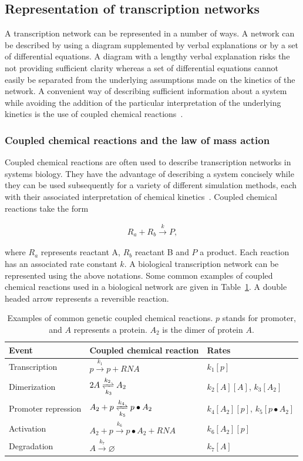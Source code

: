 \subsection{Representation of transcription networks}
A transcription network can be represented in a number of ways. A network can be described by using a diagram supplemented by verbal explanations or by a set of differential equations. A diagram with a lengthy verbal explanation risks the not providing sufficient clarity whereas a set of differential equations cannot easily be separated from the underlying assumptions made on the kinetics of the network. A convenient way of describing sufficient information about a system while avoiding the addition of the particular interpretation of the underlying kinetics is the use of coupled chemical reactions~\autocite{Wilkinson:2006td}. 

\subsubsection{Coupled chemical reactions and the law of mass action}

Coupled chemical reactions are often used to describe transcription networks in systems biology. They have the advantage of describing a system concisely while they can be used subsequently for a variety of different simulation methods, each with their associated interpretation of chemical kinetics~\autocite{Wilkinson:2006td}. Coupled chemical reactions take the form


\begin{align}
	R_a + R_b \xrightarrow{k} P, \label{eq:example_eq}
\end{align}

\noindent where $R_a$ represents reactant A, $R_b$ reactant B and $P$ a product. Each reaction has an associated rate constant $k$. A biological transcription network can be represented using the above notations. Some common examples of coupled chemical reactions used in a biological network are given in Table~\ref{tab:chem_reac_ex}. A double headed arrow represents a reversible reaction. 


\begin{table}[tb]
\centering
\caption{Examples of common genetic coupled chemical reactions. $p$ stands for promoter, and $A$ represents a protein. $A_2$ is the dimer of protein $A$.  }
\label{tab:chem_reac_ex}
\begin{tabular}{@{}lll@{}}
\toprule
Event & Coupled chemical reaction & Rates\\ \midrule
Transcription & $p  \xrightarrow{k_1} p + RNA$ & $k_1[p]$\\
Dimerization & $2A \xrightleftharpoons[k_3]{k_2} A_2$&$ k_2[A][A]$, $ k_3[A_2]$\\
Promoter repression & $A_2 + p \xrightleftharpoons[k_5]{k_4} p\bullet A_2$& $ k_4[A_2][p]$, $ k_5[p\bullet A_2]$ \\
Activation & $A_2 + p \xrightarrow{k_6} p\bullet A_2 + RNA$ & $ k_6[A_2][p]$\\
Degradation & $A \xrightarrow{k_7}\varnothing $ &$k_7[A]$\\ \bottomrule
\end{tabular}
\end{table}

